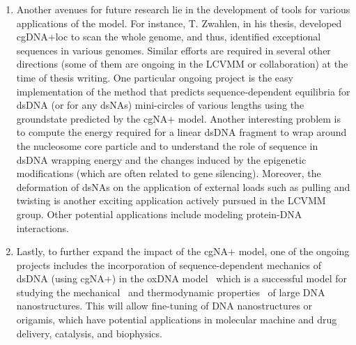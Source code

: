 \begin{enumerate}

\item  Another avenues for future research lie in the development of tools for various applications of the model. 
For instance, T. Zwahlen, in his thesis, developed cgDNA$+$loc to scan the whole genome, and thus, identified exceptional sequences in various genomes.
Similar efforts are required in several other directions (some of them are ongoing in the LCVMM or collaboration) at the time of thesis writing.
One particular ongoing project is the easy implementation of the method that predicts sequence-dependent equilibria for dsDNA (or for any dsNAs) mini-circles of various lengths using the groundstate predicted by the cgNA$+$ model.
Another interesting problem is to compute the energy required for a linear dsDNA fragment to wrap around the nucleosome core particle and to understand the role of sequence in dsDNA wrapping energy and the changes induced by the epigenetic modifications (which are often related to gene silencing).
Moreover, the deformation of dsNAs on the application of external loads such as pulling and twisting is another exciting application actively pursued in the LCVMM group.
Other potential applications include modeling protein-DNA interactions. 

\item Lastly, to further expand the impact of the cgNA$+$ model, one of the ongoing projects includes the incorporation of sequence-dependent mechanics of dsDNA (using cgNA$+$) in the oxDNA model~\cite{ouldridge2011structural,oxdna2} which is a successful model for studying the mechanical~\cite{myoxDNA} and thermodynamic properties~\cite{ouldridge2011structural} of large DNA nanostructures.
This will allow fine-tuning of DNA nanostructures or origamis, which have potential applications in molecular machine and drug delivery, catalysis, and biophysics.

\end{enumerate}
